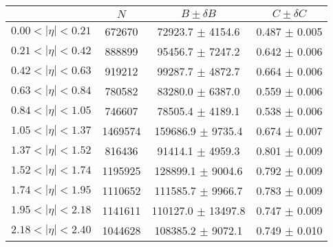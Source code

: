 \begin{tabular}{lccc}
\hline
    &   $N$   & $B \pm \delta B$  &  $C \pm \delta C$ \\
\hline
$0.00 < |\eta| <0.21$          & 672670     & 72923.7    $\pm$ 4154.6 & 0.487      $\pm$ 0.005 \\
$0.21 < |\eta| <0.42$          & 888899     & 95456.7    $\pm$ 7247.2 & 0.642      $\pm$ 0.006 \\
$0.42 < |\eta| <0.63$          & 919212     & 99287.7    $\pm$ 4872.7 & 0.664      $\pm$ 0.006 \\
$0.63 < |\eta| <0.84$          & 780582     & 83280.0    $\pm$ 6387.0 & 0.559      $\pm$ 0.006 \\
$0.84 < |\eta| <1.05$          & 746607     & 78505.4    $\pm$ 4189.1 & 0.538      $\pm$ 0.006 \\
$1.05 < |\eta| <1.37$          & 1469574    & 159686.9   $\pm$ 9735.4 & 0.674      $\pm$ 0.007 \\
$1.37 < |\eta| <1.52$          & 816436     & 91414.1    $\pm$ 4959.3 & 0.801      $\pm$ 0.009 \\
$1.52 < |\eta| <1.74$          & 1195925    & 128899.1   $\pm$ 9004.6 & 0.792      $\pm$ 0.009 \\
$1.74 < |\eta| <1.95$          & 1110652    & 111585.7   $\pm$ 9966.7 & 0.783      $\pm$ 0.009 \\
$1.95 < |\eta| <2.18$          & 1141611    & 110127.0   $\pm$ 13497.8 & 0.747      $\pm$ 0.009 \\
$2.18 < |\eta| <2.40$          & 1044628    & 108385.2   $\pm$ 9072.1 & 0.749      $\pm$ 0.010 \\
\hline
\end{tabular}
